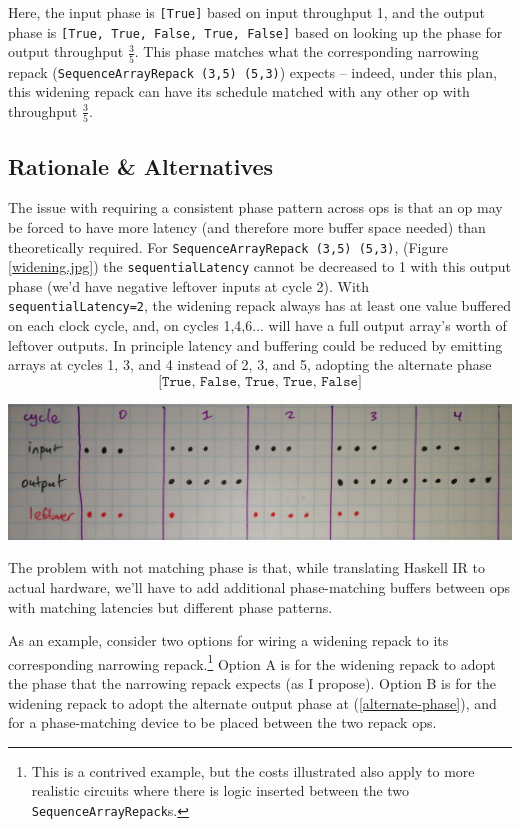 \documentclass[12pt]{article}
\begin{document}
Here, the input phase is \texttt{[True]} based on input throughput 1,
and the output phase is \texttt{[True, True, False, True, False]}
based on looking up the phase for output throughput
$\frac{3}{5}$. This phase matches what the corresponding narrowing
repack (\texttt{SequenceArrayRepack (3,5) (5,3)}) expects -- indeed,
under this plan, this widening repack can have its schedule matched
with any other op with throughput $\frac{3}{5}$.

\subsection{Rationale \& Alternatives}

The issue with requiring a consistent phase pattern across ops is that
an op may be forced to have more latency (and therefore more buffer
space needed) than theoretically required. For
\texttt{SequenceArrayRepack (3,5) (5,3)}, (Figure \ref{widening.jpg})
the \texttt{sequentialLatency} cannot be decreased to 1 with this
output phase (we'd have negative leftover inputs at cycle 2). With
\texttt{sequentialLatency=2}, the widening repack always has at least
one value buffered on each clock cycle, and, on cycles 1,4,6... will
have a full output array's worth of leftover outputs.  In principle
latency and buffering could be reduced by emitting arrays at cycles 1,
3, and 4 instead of 2, 3, and 5, adopting the alternate phase
\begin{equation}
    \texttt{[True, False, True, True, False]} %
    \label{alternate-phase}
\end{equation}

\begin{center}
\includegraphics[width=1.0\linewidth]{Figures/alternate-widening.jpg}
\end{center}

The problem with not matching phase is that, while translating Haskell
IR to actual hardware, we'll have to add additional phase-matching
buffers between ops with matching latencies but different phase
patterns.

As an example, consider two options for wiring a widening repack to
its corresponding narrowing repack.\footnote{This is a contrived
  example, but the costs illustrated also apply to more realistic
  circuits where there is logic inserted between the two
  \texttt{SequenceArrayRepack}s.  } Option A is for the widening
repack to adopt the phase that the narrowing repack expects (as I
propose). Option B is for the widening repack to adopt the alternate
output phase at (\ref{alternate-phase}), and for a phase-matching
device to be placed between the two repack ops.
\end{document}
